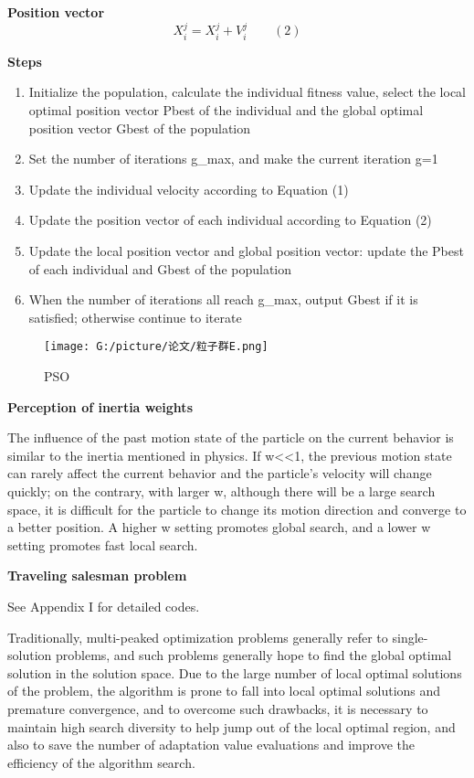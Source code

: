 \documentclass[twocolumn]{article}
\begin{document}
\textbf{Position vector}
\[X_i^j = X_i^j+V_i^j\qquad(2)\]

\textbf{Steps}

	\begin{enumerate}
	\def\labelenumii{\arabic{enumii}.}
	\item
	Initialize the population, calculate the individual fitness value,
	select the local optimal position vector Pbest of the individual and
	the global optimal position vector Gbest of the population
	\item
	Set the number of iterations g\_max, and make the current iteration
	g=1
	\item
	Update the individual velocity according to Equation (1)
	\item
	Update the position vector of each individual according to Equation
	(2)
	\item
	Update the local position vector and global position vector: update
	the Pbest of each individual and Gbest of the population
	\item
	When the number of iterations all reach g\_max, output Gbest if it is
	satisfied; otherwise continue to iterate
	\end{enumerate}

\begin{figure}
	\centering
	\texttt{[image: G:/picture/论文/粒子群E.png]}
	\caption{PSO}
\end{figure}

\textbf{Perception of inertia weights}

The influence of the past motion state of the particle on the current
behavior is similar to the inertia mentioned in physics. If
w\textless\textless1, the previous motion state can rarely affect the
current behavior and the particle's velocity will change quickly; on the
contrary, with larger w, although there will be a large search space, it
is difficult for the particle to change its motion direction and
converge to a better position. A higher w setting promotes global
search, and a lower w setting promotes fast local search.

\textbf{Traveling salesman problem}

See Appendix I for detailed codes.

Traditionally, multi-peaked optimization problems generally refer to
single-solution problems, and such problems generally hope to find the
global optimal solution in the solution space. Due to the large number
of local optimal solutions of the problem, the algorithm is prone to
fall into local optimal solutions and premature convergence, and to
overcome such drawbacks, it is necessary to maintain high search
diversity to help jump out of the local optimal region, and also to save
the number of adaptation value evaluations and improve the efficiency of
the algorithm search.
\end{document}
